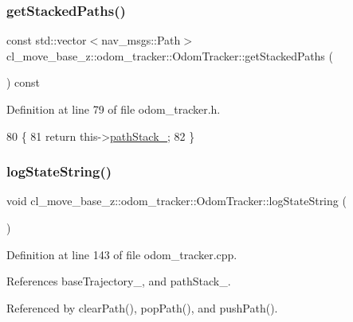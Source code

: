 \subsubsection{\texorpdfstring{get\+Stacked\+Paths()}{getStackedPaths()}}
{\footnotesize\ttfamily const std\+::vector$<$nav\+\_\+msgs\+::\+Path$>$ cl\+\_\+move\+\_\+base\+\_\+z\+::odom\+\_\+tracker\+::\+Odom\+Tracker\+::get\+Stacked\+Paths (\begin{DoxyParamCaption}{ }\end{DoxyParamCaption}) const\hspace{0.3cm}{\ttfamily [inline]}}



Definition at line 79 of file odom\+\_\+tracker.\+h.


\begin{DoxyCode}
80     \{
81         \textcolor{keywordflow}{return} this->\hyperlink{classcl__move__base__z_1_1odom__tracker_1_1OdomTracker_a1ccad1b568b6c65da43ba6639b6bd1ef}{pathStack\_};
82     \}
\end{DoxyCode}
\mbox{\label{classcl__move__base__z_1_1odom__tracker_1_1OdomTracker_a6d0b450474d9d555205ff4281965164e}} 
\subsubsection{\texorpdfstring{log\+State\+String()}{logStateString()}}
{\footnotesize\ttfamily void cl\+\_\+move\+\_\+base\+\_\+z\+::odom\+\_\+tracker\+::\+Odom\+Tracker\+::log\+State\+String (\begin{DoxyParamCaption}{ }\end{DoxyParamCaption})}



Definition at line 143 of file odom\+\_\+tracker.\+cpp.



References base\+Trajectory\+\_\+, and path\+Stack\+\_\+.



Referenced by clear\+Path(), pop\+Path(), and push\+Path().



